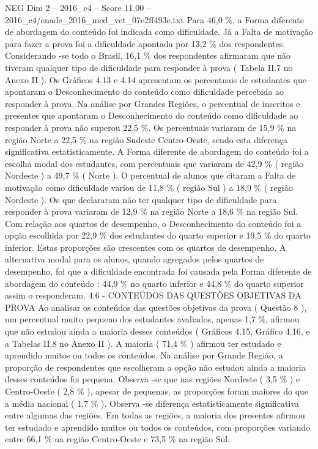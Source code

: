 \begin{textsample}{NEG Dim 2 – 2016\_c4 – Score 11.00 – 2016\_c4/enade\_2016\_med\_vet\_07e2ff493e.txt}
Para 46,0 \%, a Forma diferente de abordagem do conteúdo foi indicada como dificuldade.
Já a Falta de motivação para fazer a prova foi a dificuldade apontada por 13,2 \% dos respondentes.
Considerando -se todo o Brasil, 16,1 \% dos respondentes afirmaram que não tiveram qualquer tipo de dificuldade para responder à prova ( Tabela II.7 no Anexo II ).
Os Gráficos 4.13 e 4.14 apresentam os percentuais de estudantes que apontaram o Desconhecimento do conteúdo como dificuldade percebida ao responder à prova.
Na análise por Grandes Regiões, o percentual de inscritos e presentes que apontaram o Desconhecimento do conteúdo como dificuldade ao responder à prova não superou 22,5 \%.
Os percentuais variaram de 15,9 \% na região Norte a 22,5 \% na região Sudeste Centro-Oeste, sendo esta diferença significativa estatisticamente.
A Forma diferente de abordagem do conteúdo foi a escolha modal dos estudantes, com percentuais que variaram de 42,9 \% ( região Nordeste ) a 49,7 \% ( Norte ).
O percentual de alunos que citaram a Falta de motivação como dificuldade variou de 11,8 \% ( região Sul ) a 18,9 \% ( região Nordeste ).
Os que declararam não ter qualquer tipo de dificuldade para responder à prova variaram de 12,9 \% na região Norte a 18,6 \% na região Sul.
Com relação aos quartos de desempenho, o Desconhecimento do conteúdo foi a opção escolhida por 22,9 \% dos estudantes do quarto superior e 19,5 \% do quarto inferior.
Estas proporções são crescentes com os quartos de desempenho.
A alternativa modal para os alunos, quando agregados pelos quartos de desempenho, foi que a dificuldade encontrada foi causada pela Forma diferente de abordagem do conteúdo : 44,9 \% no quarto inferior e 44,8 \% do quarto superior assim o responderam. 4.6 - CONTEÚDOS DAS QUESTÕES OBJETIVAS DA PROVA Ao analisar os conteúdos das questões objetivas da prova ( Questão 8 ), um percentual muito pequeno dos estudantes avaliados, apenas 1,7 \%, afirmou que não estudou ainda a maioria desses conteúdos ( Gráficos 4.15, Gráfico 4.16, e a Tabelas II.8 no Anexo II ).
A maioria ( 71,4 \% ) afirmou ter estudado e aprendido muitos ou todos os conteúdos.
Na análise por Grande Região, a proporção de respondentes que escolheram a opção não estudou ainda a maioria desses conteúdos foi pequena.
Observa -se que nas regiões Nordeste ( 3,5 \% ) e Centro-Oeste ( 2,8 \% ), apesar de pequenas, as proporções foram maiores do que a média nacional ( 1,7 \% ).
Observa -se diferença estatisticamente significativa entre algumas das regiões.
Em todas as regiões, a maioria dos presentes afirmou ter estudado e aprendido muitos ou todos os conteúdos, com proporções variando entre 66,1 \% na região Centro-Oeste e 73,5 \% na região Sul.

\end{textsample}
